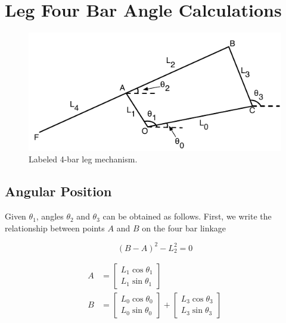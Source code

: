 \documentclass[letterpaper]{article}
\begin{document}
\section{Leg Four Bar Angle Calculations}

\begin{figure}[htb]
	\centering
	\includegraphics{4bar.pdf}
	\caption{Labeled 4-bar leg mechanism.}
	\label{fig:4bar}
\end{figure}

\subsection{Angular Position}
Given $\theta_1$, angles $\theta_2$ and $\theta_3$ can be obtained as follows. First, we write the relationship between points $A$ and $B$ on the four bar linkage

\begin{equation}
	(B - A)^2 - L_2^2 = 0
	\label{eq:BArel}
\end{equation}

\begin{align}
	A &= \begin{bmatrix} L_1 \cos \theta_1 \\ L_1 \sin \theta_1 \end{bmatrix}   \label{eq:Aloc}\\
	B &= \begin{bmatrix} L_0 \cos \theta_0 \\ L_0 \sin \theta_0 \end{bmatrix} 
			+ \begin{bmatrix} L_3 \cos \theta_3 \\ L_3 \sin \theta_3 \end{bmatrix} \label{eq:Bloc}
\end{align}
\end{document}
